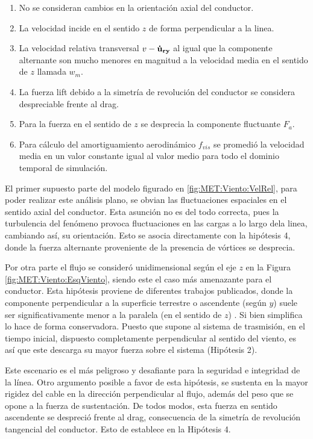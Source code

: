 \begin{enumerate}
	\item No se consideran cambios en la orientación axial del conductor.
	\item La velocidad incide en el sentido $z$ de forma perpendicular a la linea. 
	\item La velocidad relativa transversal $v-\bf{\dot{u}}_{ry}$ al igual que la componente alternante son mucho menores en magnitud a la velocidad media en el sentido de $z$ llamada $w_m$.
	\item La fuerza lift debido a la simetría de revolución del conductor se considera despreciable frente al drag.
	\item Para la fuerza en el sentido de $z$ se desprecia la componente fluctuante $F_a$.
	\item Para cálculo del amortiguamiento aerodinámico $f_{vis}$ se promedió la velocidad media en un valor constante igual al valor medio para todo el dominio temporal de simulación.
\end{enumerate}

El primer supuesto parte del modelo figurado en \ref{fig:MET:Viento:VelRel}, para poder realizar este análisis plano, se obvian las fluctuaciones espaciales en el sentido axial del conductor. Esta asunción no es del todo correcta, pues la turbulencia del fenómeno provoca fluctuaciones en las cargas a lo largo dela linea, cambiando así, su orientación.  Esto se asocia directamente con la hipótesis 4, donde la fuerza alternante proveniente de la presencia de vórtices se desprecia. 

Por otra parte el flujo se consideró unidimensional según el eje $z$ en la Figura \ref{fig:MET:Viento:EsqViento}, siendo este el caso más amenazante para el conductor. Esta hipótesis proviene de diferentes trabajos publicados, donde la componente perpendicular a la superficie terrestre o ascendente (según $y$) suele ser significativamente menor a la paralela (en el sentido de $z$) \citep{duranona2009analysis} \citep{stengel2017measurements} \cite{yang2016nonlinear}. Si bien simplifica lo hace de forma conservadora.  Puesto que supone al sistema de trasmisión, en el tiempo inicial, dispuesto completamente perpendicular al sentido del viento, es así que este descarga su mayor fuerza sobre el sistema (Hipótesis 2). 

Este escenario es el más peligroso y desafiante para la seguridad e integridad de la línea. Otro argumento posible a favor de esta hipótesis, se sustenta en la mayor rigidez del cable en la dirección perpendicular al flujo, además del peso que se opone a la fuerza de sustentación. De todos modos, esta fuerza en sentido ascendente se despreció frente al drag, consecuencia de la simetría de revolución tangencial del conductor. Esto de establece en la Hipótesis 4. 

